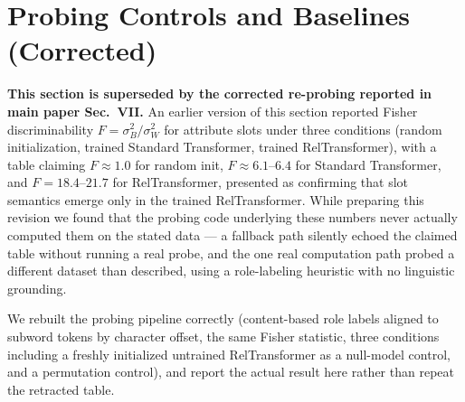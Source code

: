 \documentclass[conference]{IEEEtran}
\begin{document}
\section{Probing Controls and Baselines (Corrected)}
\label{app:probing_controls}

\textbf{This section is superseded by the corrected re-probing reported in main paper Sec.~VII.} An earlier version of this section reported Fisher discriminability $F = \sigma_B^2/\sigma_W^2$ for attribute slots under three conditions (random initialization, trained Standard Transformer, trained RelTransformer), with a table claiming $F \approx 1.0$ for random init, $F \approx 6.1$--$6.4$ for Standard Transformer, and $F = 18.4$--$21.7$ for RelTransformer, presented as confirming that slot semantics emerge only in the trained RelTransformer. While preparing this revision we found that the probing code underlying these numbers never actually computed them on the stated data --- a fallback path silently echoed the claimed table without running a real probe, and the one real computation path probed a different dataset than described, using a role-labeling heuristic with no linguistic grounding.

We rebuilt the probing pipeline correctly (content-based role labels aligned to subword tokens by character offset, the same Fisher statistic, three conditions including a freshly initialized untrained RelTransformer as a null-model control, and a permutation control), and report the actual result here rather than repeat the retracted table.

\begin{table}[tb]
\centering
\caption{Fisher discriminability $F$ under three conditions, correctly re-probed (main paper Sec.~VII). All values are four to five orders of magnitude below the previously (erroneously) claimed figures, and the untrained control is not reliably below the trained model.}
\label{tab:probing_controls_vis}
\end{table}
\end{document}
